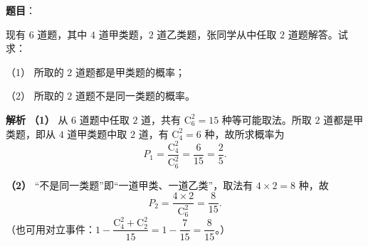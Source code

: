 \begin{answer}

\textbf{题目}：

现有 $6$ 道题，其中 $4$ 道甲类题，$2$ 道乙类题，张同学从中任取 $2$ 道题解答。试求：

（1） 所取的 $2$ 道题都是甲类题的概率；

（2） 所取的 $2$ 道题不是同一类题的概率。

\textbf{解析}
\textbf{（1）} 从 $6$ 道题中任取 $2$ 道，共有 $\mathrm C_6^2=15$ 种等可能取法。所取 $2$ 道都是甲类题，即从 $4$ 道甲类题中取 $2$ 道，有 $\mathrm C_4^2=6$ 种，故所求概率为
\nopagebreak[4]
\[P_1=\frac{\mathrm C_4^2}{\mathrm C_6^2}=\frac6{15}=\frac25.\]

\textbf{（2）} “不是同一类题”即“一道甲类、一道乙类”，取法有 $4\times2=8$ 种，故
\nopagebreak[4]
\[P_2=\frac{4\times2}{\mathrm C_6^2}=\frac8{15}.\]
（也可用对立事件：$1-\dfrac{\mathrm C_4^2+\mathrm C_2^2}{15}=1-\dfrac7{15}=\dfrac8{15}$。）



\end{answer}
